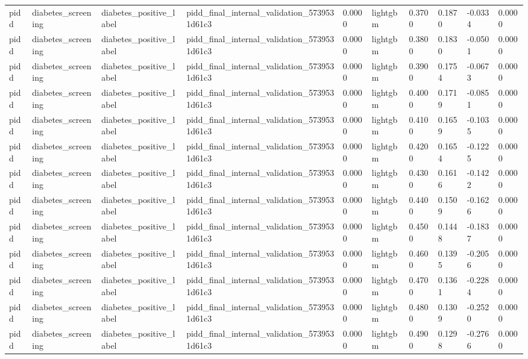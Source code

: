\begin{tabular}{llllllllll}
pidd & diabetes\_screening & diabetes\_positive\_label & pidd\_final\_internal\_validation\_5739531d61c3 & 0.0000 & lightgbm & 0.3700 & 0.1870 & -0.0334 & 0.0000 \\
pidd & diabetes\_screening & diabetes\_positive\_label & pidd\_final\_internal\_validation\_5739531d61c3 & 0.0000 & lightgbm & 0.3800 & 0.1830 & -0.0501 & 0.0000 \\
pidd & diabetes\_screening & diabetes\_positive\_label & pidd\_final\_internal\_validation\_5739531d61c3 & 0.0000 & lightgbm & 0.3900 & 0.1754 & -0.0673 & 0.0000 \\
pidd & diabetes\_screening & diabetes\_positive\_label & pidd\_final\_internal\_validation\_5739531d61c3 & 0.0000 & lightgbm & 0.4000 & 0.1719 & -0.0851 & 0.0000 \\
pidd & diabetes\_screening & diabetes\_positive\_label & pidd\_final\_internal\_validation\_5739531d61c3 & 0.0000 & lightgbm & 0.4100 & 0.1659 & -0.1035 & 0.0000 \\
pidd & diabetes\_screening & diabetes\_positive\_label & pidd\_final\_internal\_validation\_5739531d61c3 & 0.0000 & lightgbm & 0.4200 & 0.1654 & -0.1225 & 0.0000 \\
pidd & diabetes\_screening & diabetes\_positive\_label & pidd\_final\_internal\_validation\_5739531d61c3 & 0.0000 & lightgbm & 0.4300 & 0.1616 & -0.1422 & 0.0000 \\
pidd & diabetes\_screening & diabetes\_positive\_label & pidd\_final\_internal\_validation\_5739531d61c3 & 0.0000 & lightgbm & 0.4400 & 0.1509 & -0.1626 & 0.0000 \\
pidd & diabetes\_screening & diabetes\_positive\_label & pidd\_final\_internal\_validation\_5739531d61c3 & 0.0000 & lightgbm & 0.4500 & 0.1448 & -0.1837 & 0.0000 \\
pidd & diabetes\_screening & diabetes\_positive\_label & pidd\_final\_internal\_validation\_5739531d61c3 & 0.0000 & lightgbm & 0.4600 & 0.1395 & -0.2056 & 0.0000 \\
pidd & diabetes\_screening & diabetes\_positive\_label & pidd\_final\_internal\_validation\_5739531d61c3 & 0.0000 & lightgbm & 0.4700 & 0.1361 & -0.2284 & 0.0000 \\
pidd & diabetes\_screening & diabetes\_positive\_label & pidd\_final\_internal\_validation\_5739531d61c3 & 0.0000 & lightgbm & 0.4800 & 0.1309 & -0.2520 & 0.0000 \\
pidd & diabetes\_screening & diabetes\_positive\_label & pidd\_final\_internal\_validation\_5739531d61c3 & 0.0000 & lightgbm & 0.4900 & 0.1298 & -0.2766 & 0.0000 \\

\end{tabular}
